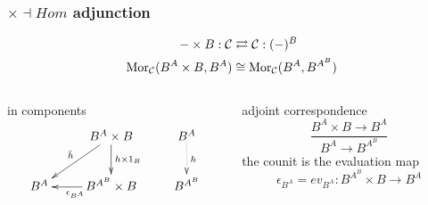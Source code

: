 \begin{frame}[t]
\frametitle{$\times \dashv Hom$ adjunction}
\begin{block}{}
\abovedisplayskip=0pt
\begin{align*}
- \times B: \mathcal{C} & \rightleftarrows \mathcal{C}: (-)^B\\
\mathop{\rm Mor}\nolimits_{\mathcal{C}}(B^A \times B, B^A) & \cong  \mathop{\rm Mor}\nolimits_{\mathcal{C}}(B^A, B^{A^B})
\end{align*}
\end{block}
\begin{columns}[t]
    \begin{column}{0.5\textwidth}
\begin{block}{in components}
			$$
			\xymatrix{
			& B^A \times B \ar[d]^-{h \times 1_B} \ar[dl]_{\bar{h}} & B^A \ar@{.>}[d]^-{h}\\
			B^A & B^{A^B} \times B \ar[l]^{\epsilon_{B^A}} & B^{A^B}}
			$$
		\end{block}
    \end{column}
    \begin{column}{0.5\textwidth}
		\begin{block}{adjoint correspondence}
		\abovedisplayskip=0pt
		$$
			\frac{B^A \times B \longrightarrow B^A}{B^A \longrightarrow B^{A^B}}
		$$
		the counit is the evaluation map
		$$
			\epsilon_{B^A} = ev_{B^A} \colon B^{A^B} \times B \longrightarrow B^A
		$$
		\end{block}		
    \end{column}
\end{columns}
\end{frame}

